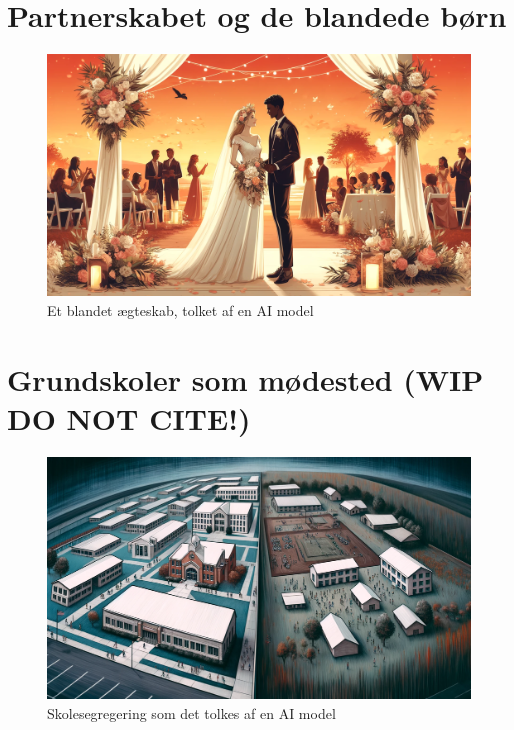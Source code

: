 \documentclass[
]{book}
\begin{document}
\hypertarget{kap2}{%
\chapter{Partnerskabet og de blandede børn}\label{kap2}}

\begin{figure}
\includegraphics[width=1\linewidth]{images/dalle-wedding} \caption{Et blandet ægteskab, tolket af en AI model}\label{fig:fig-partner}
\end{figure}

\hypertarget{kap3}{%
\chapter{\texorpdfstring{Grundskoler som mødested (\textbf{WIP DO NOT CITE!})}{Grundskoler som mødested (WIP DO NOT CITE!)}}\label{kap3}}

\begin{figure}
\includegraphics[width=1\linewidth]{images/dalle-schoolseg} \caption{Skolesegregering som det tolkes af en AI model}\label{fig:fig-schoolseg}
\end{figure}
\end{document}
